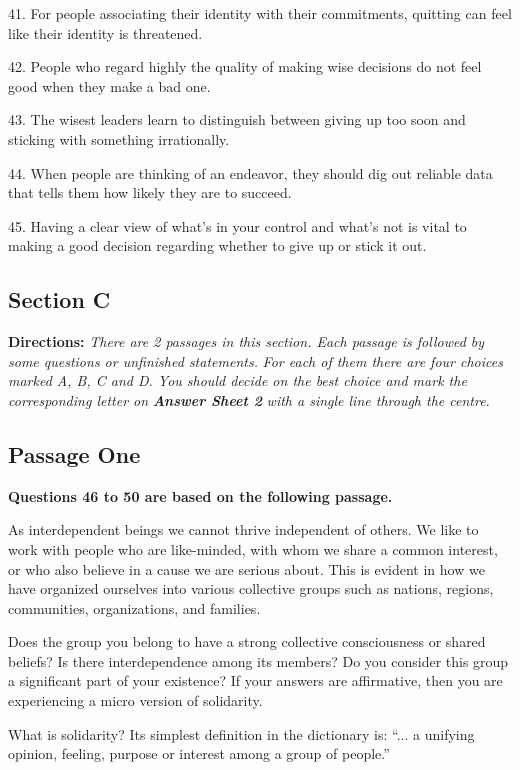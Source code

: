 \documentclass[UTF8,11pt]{ctexart}
\begin{document}
41. For people associating their identity with their commitments, quitting can feel like their identity is threatened.


42. People who regard highly the quality of making wise decisions do not feel good when they make a bad one.


43. The wisest leaders learn to distinguish between giving up too soon and sticking with something irrationally.


44. When people are thinking of an endeavor, they should dig out reliable data that tells them how likely they are to succeed.


45. Having a clear view of what’s in your control and what’s not is vital to making a good decision regarding whether to give up or stick it out.


\subsection*{\textbf{Section C}}


\textbf{Directions: }\textit{There are 2 passages in this section. Each passage is followed by some questions or unfinished statements.} \textit{For each of them there are four choices marked A, B, C and D. You should decide on the best choice and mark the} \textit{corresponding letter on }\textbf{\textit{Answer Sheet 2}}\textit{ with a single line through the centre.}


\subsection*{\textbf{Passage One}}


\textbf{Questions 46 to 50 are based on the following passage.}


As interdependent beings we cannot thrive independent of others. We like to work with people who are like-minded, with whom we share a common interest, or who also believe in a cause we are serious about. This is evident in how we have organized ourselves into various collective groups such as nations, regions, communities, organizations, and families.


Does the group you belong to have a strong collective consciousness or shared beliefs? Is there interdependence among its members? Do you consider this group a significant part of your existence? If your answers are affirmative, then you are experiencing a micro version of solidarity.


What is solidarity? Its simplest definition in the dictionary is: “... a unifying opinion, feeling, purpose or interest among a group of people.”
\end{document}
